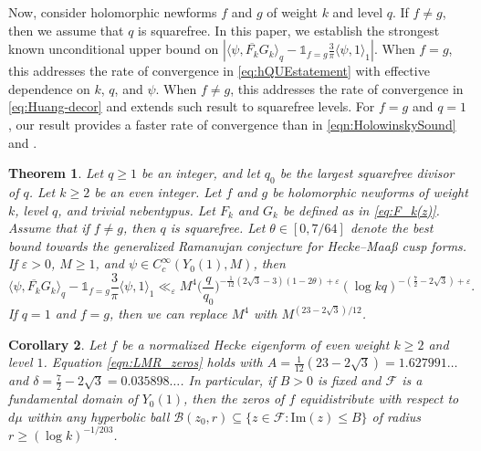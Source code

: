 \documentclass[12pt,reqno]{amsart}
\newtheorem{thm}{Theorem}[section]
\newtheorem{cor}[thm]{Corollary}
\theoremstyle{remark}
\numberwithin{equation}{section}
\begin{document}
    Now, consider holomorphic newforms $f$ and $g$ of weight $k$ and level $q$.  If $f \neq g$, then we assume that $q$ is squarefree.  In this paper, we establish the strongest known unconditional upper bound on $|\langle \psi, \overline{F_k}G_k \rangle_q - \mathds{1}_{f=g}\frac{3}{\pi}\langle \psi, 1 \rangle_1|$.  When $f=g$, this addresses the rate of convergence in \eqref{eq:hQUEstatement} with effective dependence on $k$, $q$, and $\psi$. When $f\neq g$, this addresses the rate of convergence in \eqref{eq:Huang-decor} and extends such result to squarefree levels.  For $f=g$ and $q = 1$, our result provides a faster rate of convergence than in \eqref{eqn:HolowinskySound} and \cite[Theorem 1.3]{LMR}.  


    \begin{thm}
    \label{thm:cor}
        Let $q\geq 1$ be an integer, and let $q_0$ be the largest squarefree divisor of $q$. Let $k\geq 2$ be an even integer.  Let $f$ and $g$ be holomorphic newforms of weight $k$, level $q$, and trivial nebentypus.  Let $F_k$ and $G_k$ be defined as in \eqref{eq:F_k(z)}. Assume that if $f\neq g$, then $q$ is squarefree.
        Let $\theta\in[0,7/64]$ denote the best bound towards the generalized Ramanujan conjecture for Hecke--Maa{\ss} cusp forms. If $\varepsilon>0$, $M\geq 1$, and $\psi\in C_c^{\infty}(Y_0(1),M)$, then  
	\[
       \langle \psi, \overline{F_k}G_k \rangle_q - \mathds{1}_{f=g}\frac{3}{\pi}\langle \psi, 1 \rangle_1\ll_{\varepsilon} M^{4} \Big(\frac{q}{q_0}\Big)^{-\frac{1}{12}(2\sqrt{3}-3)(1-2\theta)+\varepsilon} (\log kq)^{-(\frac{7}{2}-2\sqrt{3})+\varepsilon}.
	\]
    If $q=1$ and $f=g$, then we can replace $M^4$ with $M^{(23-2\sqrt{3})/12}$. 
    \end{thm}

    \begin{cor}
    Let $f$ be a normalized Hecke eigenform of even weight $k\geq 2$ and level $1$.  Equation \eqref{eqn:LMR_zeros} holds with $A=\frac{1}{12}(23-2\sqrt{3}) = 1.627991\ldots$ and $\delta = \frac{7}{2}-2\sqrt{3} =0.035898\ldots$.  In particular, if $B>0$ is fixed and $\mathcal{F}$ is a fundamental domain of $Y_0(1)$, then the zeros of $f$ equidistribute with respect to $d\mu$ within any hyperbolic ball ${\mathscr{B}}(z_0,r)\subseteq\{z\in\mathcal{F}\colon \mathrm{Im}(z)\leq B\}$ of radius $r\geq (\log k)^{-1/203}$.
    \end{cor}
    
\end{document}
